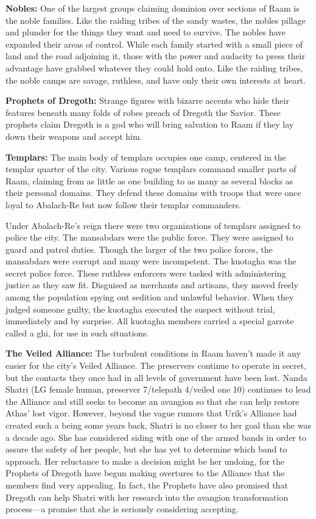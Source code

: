 {

	\textbf{Nobles:} One of the largest groups claiming dominion over sections of Raam is the noble families. Like the raiding tribes of the sandy wastes, the nobles pillage and plunder for the things they want and need to survive. The nobles have expanded their areas of control. While each family started with a small piece of land and the road adjoining it, those with the power and audacity to press their advantage have grabbed whatever they could hold onto. Like the raiding tribes, the noble camps are savage, ruthless, and have only their own interests at heart.

	\textbf{Prophets of Dregoth:} Strange figures with bizarre accents who hide their features beneath many folds of robes preach of Dregoth the Savior. These prophets claim Dregoth is a god who will bring salvation to Raam if they lay down their weapons and accept him.

	\textbf{Templars:} The main body of templars occupies one camp, centered in the templar quarter of the city. Various rogue templars command smaller parts of Raam, claiming from as little as one building to as many as several blocks as their personal domains. They defend these domains with troops that were once loyal to Abalach-Re but now follow their templar commanders.

	Under Abalach-Re's reign there were two organizations of templars assigned to police the city. The mansabdars were the public force. They were assigned to guard and patrol duties. Though the larger of the two police forces, the mansabdars were corrupt and many were incompetent. The kuotagha was the secret police force. These ruthless enforcers were tasked with administering justice as they saw fit. Disguised as merchants and artisans, they moved freely among the population spying out sedition and unlawful behavior. When they judged someone guilty, the kuotagha executed the suspect without trial, immediately and by surprise. All kuotagha members carried a special garrote called a ghi, for use in such situations.

	\textbf{The Veiled Alliance:} The turbulent conditions in Raam haven't made it any easier for the city's Veiled Alliance. The preservers continue to operate in secret, but the contacts they once had in all levels of government have been lost. Nanda Shatri (LG female human, preserver 7/telepath 4/veiled one 10) continues to lead the Alliance and still seeks to become an avangion so that she can help restore Athas' lost vigor. However, beyond the vague rumors that Urik's Alliance had created such a being some years back, Shatri is no closer to her goal than she was a decade ago. She has considered siding with one of the armed bands in order to assure the safety of her people, but she has yet to determine which band to approach. Her reluctance to make a decision might be her undoing, for the Prophets of Dregoth have begun making overtures to the Alliance that the members find very appealing. In fact, the Prophets have also promised that Dregoth can help Shatri with her research into the avangion transformation process---a promise that she is seriously considering accepting.
}
